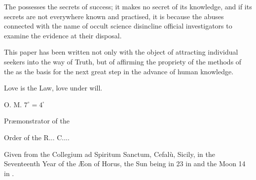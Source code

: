 The \Argentium{} possesses the secrets of success; it makes no secret of its knowledge, and if its secrets are not everywhere known and practised, it is because the abuses connected with the name of occult science disincline official investigators to examine the evidence at their disposal.

This paper has been written not only with the object of attracting individual seekers into the way of Truth, but of affirming the propriety of the methods of the \Argentium{} as the basis for the next great step in the advance of human knowledge.

Love is the Law, love under will.

{\raggedleft
O. M. $7^{\circ} = 4^{\square}$ \Argentium{}

Pr\ae{}monstrator of the

Order of the R... C....
\par}

Given from the Collegium ad Spiritum Sanctum, Cefal\`{u}, Sicily, in the Seventeenth Year of the \AE{}on of Horus, the Sun being in 23\textdegree{} in \virgo{} and the Moon 14\textdegree{} in \pisces{}.

